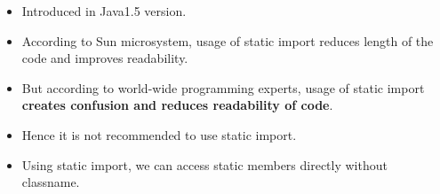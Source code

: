 \setlength{\columnsep}{3pt}
\begin{flushleft}
	\begin{itemize}
		\item Introduced in Java1.5 version.
		\item According to Sun microsystem, usage of static import reduces length of the code and improves readability.
		\item But according to world-wide programming experts, usage of static import \textbf{creates confusion and reduces readability of code}. 
		\item Hence it is not recommended to use static import.
		\item Using static import, we can access static members directly without classname.
		
		
	\end{itemize}
\end{flushleft}
\newpage


